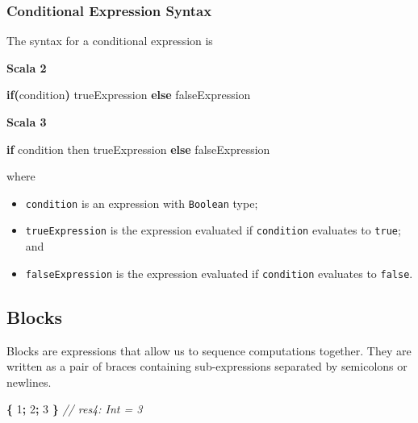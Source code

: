 \documentclass[11pt,a5paper,]{book}
\newenvironment{Shaded}{\begin{snugshade}}{\end{snugshade}}
\newcommand{\CommentTok}[1]{\textcolor[rgb]{0.56,0.35,0.01}{\textit{#1}}}
\newcommand{\ControlFlowTok}[1]{\textcolor[rgb]{0.13,0.29,0.53}{\textbf{#1}}}
\newcommand{\DecValTok}[1]{\textcolor[rgb]{0.00,0.00,0.81}{#1}}
\newcommand{\NormalTok}[1]{#1}
\newcommand{\OperatorTok}[1]{\textcolor[rgb]{0.81,0.36,0.00}{\textbf{#1}}}
\providecommand{\tightlist}{%
  \setlength{\itemsep}{0pt}\setlength{\parskip}{0pt}}
\begin{document}
\hypertarget{conditional-expression-syntax}{%
\subsubsection*{Conditional Expression
Syntax}\label{conditional-expression-syntax}}

The syntax for a conditional expression is

\textbf{Scala 2}

\begin{Shaded}
\begin{Highlighting}[]
\ControlFlowTok{if}\OperatorTok{(}\NormalTok{condition}\OperatorTok{)}
\NormalTok{  trueExpression}
\ControlFlowTok{else}
\NormalTok{  falseExpression}
\end{Highlighting}
\end{Shaded}

\textbf{Scala 3}

\begin{Shaded}
\begin{Highlighting}[]
\ControlFlowTok{if}\NormalTok{ condition }
\NormalTok{then trueExpression }
\ControlFlowTok{else}\NormalTok{ falseExpression}
\end{Highlighting}
\end{Shaded}

where

\begin{itemize}
\tightlist
\item
  \texttt{condition} is an expression with \texttt{Boolean} type;
\item
  \texttt{trueExpression} is the expression evaluated if
  \texttt{condition} evaluates to \texttt{true}; and
\item
  \texttt{falseExpression} is the expression evaluated if
  \texttt{condition} evaluates to \texttt{false}.
\end{itemize}

\hypertarget{blocks}{%
\subsection{Blocks}\label{blocks}}

Blocks are expressions that allow us to sequence computations together.
They are written as a pair of braces containing sub-expressions
separated by semicolons or newlines.

\begin{Shaded}
\begin{Highlighting}[]
\OperatorTok{\{} \DecValTok{1}\OperatorTok{;} \DecValTok{2}\OperatorTok{;} \DecValTok{3} \OperatorTok{\}}
\CommentTok{// res4: Int = 3}
\end{Highlighting}
\end{Shaded}
\end{document}
